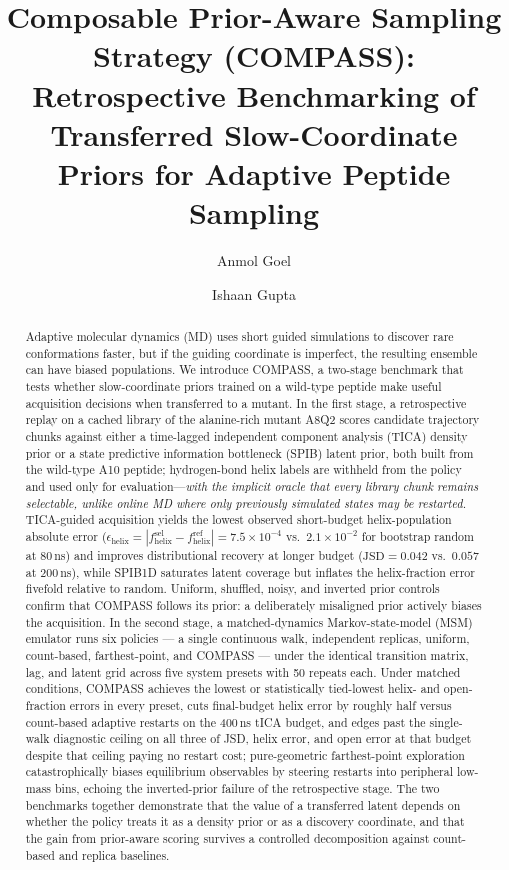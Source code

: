 \documentclass[journal=jctcce,manuscript=article,layout=twocolumn]{achemso}
\title{Composable Prior-Aware Sampling Strategy (COMPASS): Retrospective Benchmarking of Transferred Slow-Coordinate Priors for Adaptive Peptide Sampling}
\author{Anmol Goel}
\affiliation{Department of Biochemical Engineering and Biotechnology, Indian Institute of Technology Delhi, New Delhi 110016, India}
\author{Ishaan Gupta}
\affiliation{Department of Biochemical Engineering and Biotechnology, Indian Institute of Technology Delhi, New Delhi 110016, India}
\begin{document}

\begin{abstract}
Adaptive molecular dynamics (MD) uses short guided simulations to discover rare conformations faster, but if the guiding coordinate is imperfect, the resulting ensemble can have biased populations.
We introduce COMPASS, a two-stage benchmark that tests whether slow-coordinate priors trained on a wild-type peptide make useful acquisition decisions when transferred to a mutant.
In the first stage, a retrospective replay on a cached library of the alanine-rich mutant A8Q2 scores candidate trajectory chunks against either a time-lagged independent component analysis (TICA) density prior or a state predictive information bottleneck (SPIB) latent prior, both built from the wild-type A10 peptide; hydrogen-bond helix labels are withheld from the policy and used only for evaluation---\emph{with the implicit oracle that every library chunk remains selectable, unlike online MD where only previously simulated states may be restarted.}
TICA-guided acquisition yields the lowest observed short-budget helix-population absolute error ($\epsilon_{\mathrm{helix}} = |f_{\mathrm{helix}}^{\mathrm{sel}}-f_{\mathrm{helix}}^{\mathrm{ref}}| = 7.5\times10^{-4}$ vs.\ $2.1\times10^{-2}$ for bootstrap random at $80$\,ns) and improves distributional recovery at longer budget ($\mathrm{JSD} = 0.042$ vs.\ $0.057$ at $200$\,ns), while SPIB1D saturates latent coverage but inflates the helix-fraction error fivefold relative to random. Uniform, shuffled, noisy, and inverted prior controls confirm that COMPASS follows its prior: a deliberately misaligned prior actively biases the acquisition.
In the second stage, a matched-dynamics Markov-state-model (MSM) emulator runs six policies --- a single continuous walk, independent replicas, uniform, count-based, farthest-point, and COMPASS --- under the identical transition matrix, lag, and latent grid across five system presets with 50 repeats each. Under matched conditions, COMPASS achieves the lowest or statistically tied-lowest helix- and open-fraction errors in every preset, cuts final-budget helix error by roughly half versus count-based adaptive restarts on the 400\,ns tICA budget, and edges past the single-walk diagnostic ceiling on all three of JSD, helix error, and open error at that budget despite that ceiling paying no restart cost; pure-geometric farthest-point exploration catastrophically biases equilibrium observables by steering restarts into peripheral low-mass bins, echoing the inverted-prior failure of the retrospective stage.
The two benchmarks together demonstrate that the value of a transferred latent depends on whether the policy treats it as a density prior or as a discovery coordinate, and that the gain from prior-aware scoring survives a controlled decomposition against count-based and replica baselines.
\end{abstract}
\end{document}
